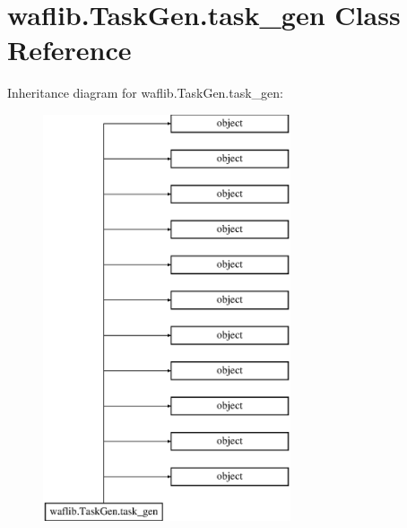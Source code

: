 \hypertarget{classwaflib_1_1_task_gen_1_1task__gen}{}\section{waflib.\+Task\+Gen.\+task\+\_\+gen Class Reference}
\label{classwaflib_1_1_task_gen_1_1task__gen}
Inheritance diagram for waflib.\+Task\+Gen.\+task\+\_\+gen\+:\begin{figure}[H]
\begin{center}
\leavevmode
\includegraphics[height=12.000000cm]{classwaflib_1_1_task_gen_1_1task__gen}
\end{center}
\end{figure}

